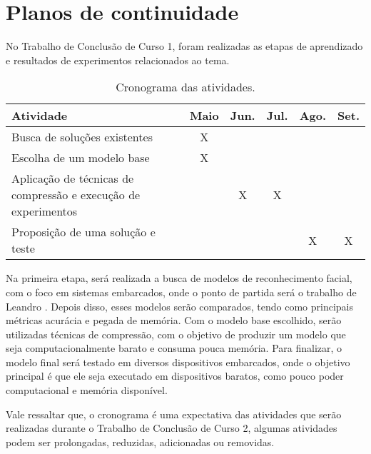 \chapter{Planos de continuidade}
No Trabalho de Conclusão de Curso 1, foram realizadas as etapas de aprendizado e resultados de experimentos
relacionados ao tema.

\begin{center}
\begin{table}[htb]
\centering
\ABNTEXfontereduzida
\caption[Cronograma das atividades]{Cronograma das atividades.}
\label{tabela_plano}
\begin{tabular}{ |l|c|c|c|c|c| }
	\hline
	Atividade & Maio & Jun. & Jul. & Ago. & Set. \\
	\hline
	Busca de soluções existentes & X & & & & \\
	\hline
	Escolha de um modelo base & X & &  & & \\
	\hline
	Aplicação de técnicas de compressão e execução de experimentos & & X & X & & \\
	\hline
	Proposição de uma solução e teste & & & & X & X \\
	\hline
\end{tabular}
\end{table}
\end{center}

Na primeira etapa, será realizada a busca de modelos de reconhecimento facial, com o foco em sistemas embarcados,
onde o ponto de partida será o trabalho de Leandro \cite{leandro}.
Depois disso, esses modelos serão comparados, tendo como principais métricas acurácia e pegada de memória.
Com o modelo base escolhido, serão utilizadas técnicas de compressão, com o objetivo de produzir um modelo que seja
computacionalmente barato e consuma pouca memória.
Para finalizar, o modelo final será testado em diversos dispositivos embarcados, onde o objetivo principal é que ele
seja executado em dispositivos baratos, como pouco poder computacional e memória disponível.

Vale ressaltar que, o cronograma é uma expectativa das atividades que serão realizadas durante o Trabalho de Conclusão
de Curso 2, algumas atividades podem ser prolongadas, reduzidas, adicionadas ou removidas.
